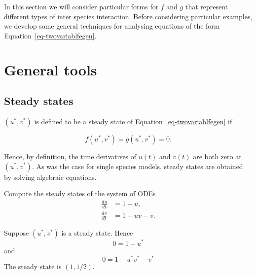\documentclass[
  letterpaper,
  DIV=11,
  numbers=noendperiod]{scrreprt}
\begin{document}
In this section we will consider particular forms for \(f\) and \(g\)
that represent different types of inter species interaction. Before
considering particular examples, we develop some general techniques for
analysing equations of the form Equation~\ref{eq-twovariablfegen}.

\hypertarget{general-tools}{%
\section{General tools}\label{general-tools}}

\hypertarget{steady-states}{%
\subsection{Steady states}\label{steady-states}}

\((u^*,v^*)\) is defined to be a steady state of
Equation~\ref{eq-twovariablfegen} if

\[
f(u^*,v^*)=g(u^*,v^*)=0.
\]

Hence, by definition, the time derivatives of \(u(t)\) and \(v(t)\) are
both zero at \((u^*,v^*)\). As was the case for single species models,
steady states are obtained by solving algebraic equations.

\begin{tcolorbox}[enhanced jigsaw, bottomtitle=1mm, rightrule=.15mm, colback=white, leftrule=.75mm, title=\textcolor{quarto-callout-note-color}{\faInfo}\hspace{0.5em}{Note}, bottomrule=.15mm, coltitle=black, toptitle=1mm, breakable, colframe=quarto-callout-note-color-frame, titlerule=0mm, toprule=.15mm, opacitybacktitle=0.6, arc=.35mm, colbacktitle=quarto-callout-note-color!10!white, left=2mm, opacityback=0]

Compute the steady states of the system of ODEs \[
\begin{aligned}
\frac{du}{dt}&=1-u,  \nonumber \\
\frac{dv}{dt}&=1-uv-v.
\end{aligned}
\]

\end{tcolorbox}

\begin{tcolorbox}[enhanced jigsaw, bottomtitle=1mm, rightrule=.15mm, colback=white, leftrule=.75mm, title=\textcolor{quarto-callout-tip-color}{\faLightbulb}\hspace{0.5em}{Tip}, bottomrule=.15mm, coltitle=black, toptitle=1mm, breakable, colframe=quarto-callout-tip-color-frame, titlerule=0mm, toprule=.15mm, opacitybacktitle=0.6, arc=.35mm, colbacktitle=quarto-callout-tip-color!10!white, left=2mm, opacityback=0]

Suppose \((u^*,v^*)\) is a steady state. Hence \[
 0=1-u^*
 \] and \[
 0=1-u^*v^*-v^*
 \] The steady state is \((1,1/2)\).

\end{tcolorbox}
\end{document}
